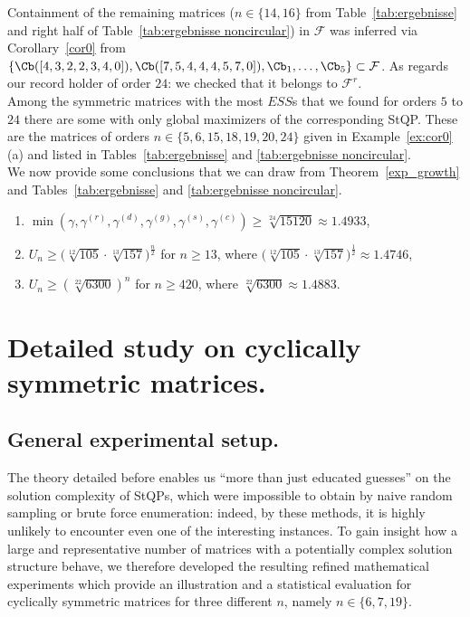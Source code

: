 \documentclass[moor]{informs3}              %
\begin{document}
Containment of the remaining matrices ($n\in\{14,16\}$ from Table~\ref{tab:ergebnisse} and right half of Table~\ref{tab:ergebnisse noncircular}) in $\mathcal{F}$ was inferred via Corollary~\ref{cor0} from $\{\Cb([4,3,2,2,3,4,0]),\Cb([7,5,4,4,4,5,7,0]),\Cb_1,\ldots,\Cb_5\}\subset\mathcal{F}$. As regards our record holder of order $24$: we checked that it belongs to $\mathcal{F}^r$.\\
Among the symmetric matrices with the most $ESS$s that we found for orders $5$ to $24$ there are some with only global maximizers of the corresponding StQP. These are the matrices of orders $n\in\{5,6,15,18,19,20,24\}$ given in Example~\ref{ex:cor0}(a) and listed in Tables~\ref{tab:ergebnisse} and \ref{tab:ergebnisse noncircular}.\\
We now provide some conclusions that we can draw from Theorem~\ref{exp_growth} and Tables~\ref{tab:ergebnisse} and \ref{tab:ergebnisse noncircular}.
\begin{cly}\begin{enumerate}
  \item[(a)] $\min(\gamma,\gamma^{(r)},\gamma^{(d)},\gamma^{(g)},\gamma^{(s)},\gamma^{(c)})\ge\sqrt[24]{15120}\approx1.4933$,
  \item[(b)] $U_n\ge\Big(\sqrt[12]{105}\cdot\sqrt[13]{157}\Big)^{\frac n2}$ for $n\ge13$, where $\Big(\sqrt[12]{105}\cdot\sqrt[13]{157}\Big)^{\frac 12}\approx1.4746$,
  \item[(c)] $U_n\ge(\sqrt[22]{6300})^{n}$ for $n\ge420$, where $\sqrt[22]{6300}\approx1.4883$.
\end{enumerate}\end{cly}


\section{Detailed study on cyclically symmetric matrices.}\label{experistu}

\subsection{General experimental setup.}

The theory detailed before enables us ``more than just educated guesses'' on the solution complexity of StQPs, which were impossible to obtain by naive random sampling or brute force enumeration: indeed, by these methods, it is highly unlikely to encounter even one of the interesting instances. To gain insight how a large and representative number of matrices with a potentially complex solution structure behave, we therefore developed the resulting refined mathematical experiments which provide an illustration and a statistical evaluation for cyclically symmetric matrices for three different $n$, namely $n \in \{6,7,19\}$.
\end{document}
